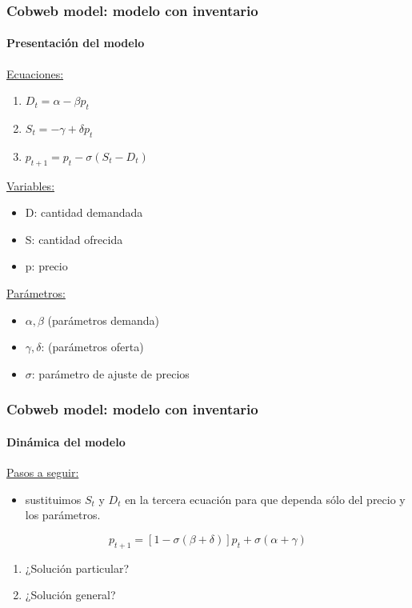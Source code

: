 \documentclass[11pt]{beamer}
\begin{document}
\begin{frame}
\frametitle{Cobweb model: modelo con inventario}
\framesubtitle{Presentación del modelo}
\begin{multicols}{2}
\underline{Ecuaciones:}
\begin{enumerate}
\item $D_t=\alpha-\beta p_t$
\item $S_t=-\gamma+\delta p_{t}$
\item $p_{t+1}=p_{t}-\sigma(S_t-D_t)$ \end{enumerate}
\underline{Variables:}
\begin{itemize}
\item D: cantidad demandada
\item S: cantidad ofrecida
\item p: precio
\end{itemize}
\vspace{1cm}
\underline{Parámetros: }
\begin{itemize}
\item $\alpha, \beta$ (parámetros demanda)
\item $\gamma, \delta$: (parámetros oferta)
\item $\sigma$: parámetro de ajuste de precios
\end{itemize}	
\end{multicols}
\end{frame}


\begin{frame}
\frametitle{Cobweb model: modelo con inventario}
\framesubtitle{Dinámica del modelo}
\underline{Pasos a seguir:}
\begin{itemize}
	\item sustituimos $S_t$ y $D_t$ en la tercera ecuación para que dependa sólo del precio y los parámetros.
\end{itemize}
\begin{equation}
p_{t+1}=[1-\sigma(\beta+\delta)]p_t+\sigma(\alpha+\gamma)
\end{equation}
\begin{enumerate}
	\item ¿Solución particular?
	\item ¿Solución general?
\end{enumerate}
\end{frame}
\end{document}
